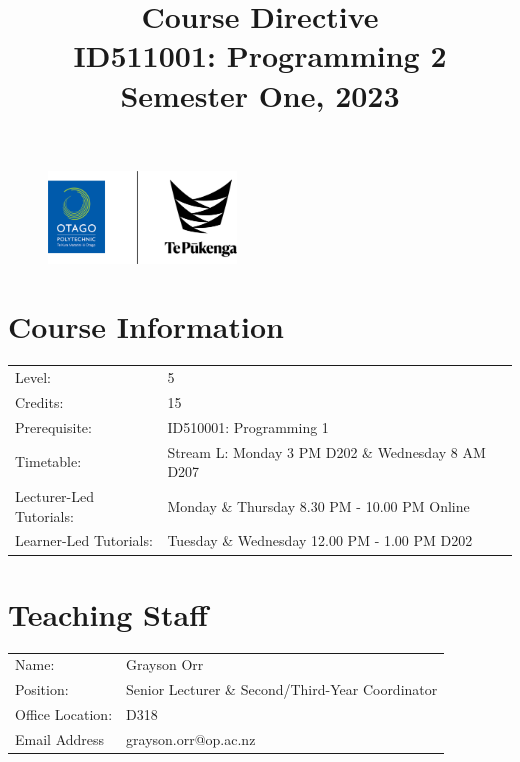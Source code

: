 \documentclass{article}
\author{}
\begin{document}
\begin{figure}
	\centering
	\includegraphics[width=50mm]{../img/logo.png}
\end{figure}

\title{Course Directive\\ID511001: Programming 2\\Semester One, 2023}
\date{}
\maketitle

\section*{Course Information}
\begin{tabular}{ll}
	Level:        & 5 \\
	Credits:      & 15                                                             \\
	Prerequisite: & ID510001: Programming 1                                  \\
	Timetable:    & Stream L: Monday 3 PM D202 \& Wednesday 8 AM D207  \\
	Lecturer-Led Tutorials: & Monday \& Thursday 8.30 PM - 10.00 PM Online     \\     
	Learner-Led Tutorials: & Tuesday \& Wednesday 12.00 PM - 1.00 PM D202    \\
\end{tabular}

\section*{Teaching Staff} 
\begin{tabular}{ll}
	Name:            & Grayson Orr                           \\
	Position:        & Senior Lecturer \& Second/Third-Year Coordinator \\
	Office Location: & D318                                 \\
	Email Address    & grayson.orr@op.ac.nz                    \\
\end{tabular}
\end{document}

